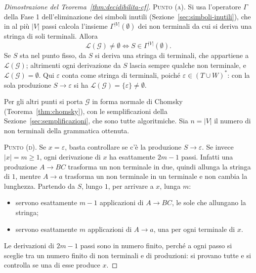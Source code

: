\documentclass[a4paper, 11pt, oneside]{book}
\theoremstyle{formale}
\begin{document}
    \begin{proof}[Dimostrazione del Teorema~\ref{thm:decidibilita-cf}]
        \textsc{Punto (a)}. Si usa l'operatore $\Gamma$ della Fase 1 dell'eliminazione dei
        simboli inutili (Sezione~\ref{sec:simboli-inutili}), che in al pi\`u $|V|$ passi
        calcola l'insieme $\Gamma^{|V|}(\emptyset)$ dei non terminali da cui si deriva una
        stringa di soli terminali. Allora
        \begin{equation*}
            \mathcal{L}(\mathcal{G}) \neq \emptyset \iff S \in \Gamma^{|V|}(\emptyset).
        \end{equation*}
        Se $S$ sta nel punto fisso, da $S$ si deriva una stringa di terminali, che
        appartiene a $\mathcal{L}(\mathcal{G})$; altrimenti ogni derivazione da $S$ lascia
        sempre qualche non terminale, e $\mathcal{L}(\mathcal{G}) = \emptyset$. Qui
        $\varepsilon$ conta come stringa di terminali, poich\'e
        $\varepsilon \in (T \cup W)^*$: con la sola produzione $S \to \varepsilon$ si ha
        $\mathcal{L}(\mathcal{G}) = \{\varepsilon\} \neq \emptyset$.

        Per gli altri punti si porta $\mathcal{G}$ in forma normale di Chomsky
        (Teorema~\ref{thm:chomsky}), con le semplificazioni della
        Sezione~\ref{sec:semplificazioni}, che sono tutte algoritmiche. Sia $n = |V|$ il
        numero di non terminali della grammatica ottenuta.

        \textsc{Punto (d)}. Se $x = \varepsilon$, basta controllare se c'\`e la produzione
        $S \to \varepsilon$. Se invece $|x| = m \geq 1$, ogni derivazione di $x$ ha
        esattamente $2m - 1$ passi. Infatti una produzione $A \to BC$ trasforma un non
        terminale in due, quindi allunga la stringa di $1$, mentre $A \to a$ trasforma un
        non terminale in un terminale e non cambia la lunghezza. Partendo da $S$, lungo
        $1$, per arrivare a $x$, lunga $m$:
        \begin{itemize}
            \item servono esattamente $m - 1$ applicazioni di $A \to BC$, le sole che
                allungano la stringa;
            \item servono esattamente $m$ applicazioni di $A \to a$, una per ogni
                terminale di $x$.
        \end{itemize}
        Le derivazioni di $2m - 1$ passi sono in numero finito, perch\'e a ogni passo si
        sceglie tra un numero finito di non terminali e di produzioni: si provano tutte e
        si controlla se una di esse produce $x$.


\end{proof}
\end{document}
